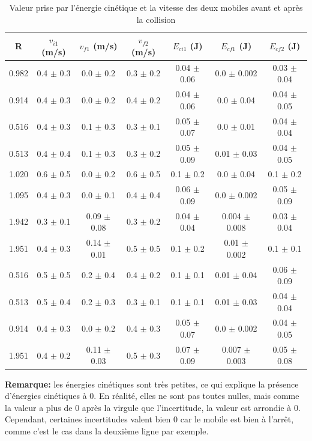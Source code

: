 \documentclass[12pt]{article}
\begin{document}
\begin{table}[h!]
    \begin{center}
        \begin{tabular}{|c|c|c|c|c|c|c|}
            \hline
            R & $v_{i1}$ (m/s) & $v_{f1}$ (m/s) & $v_{f2}$ (m/s) & $E_{ci1}$ (J) & $E_{cf1}$ (J) & $E_{cf2}$ (J) \\ \hline
            0.982 & 0.4 $\pm$ 0.3 & 0.0 $\pm$ 0.2 & 0.3 $\pm$ 0.2 & 0.04 $\pm$ 0.06 & 0.0 $\pm$ 0.002 & 0.03 $\pm$ 0.04 \\ 
0.914 & 0.4 $\pm$ 0.3 & 0.0 $\pm$ 0.2 & 0.4 $\pm$ 0.2 & 0.04 $\pm$ 0.06 & 0.0 $\pm$ 0.04 & 0.04 $\pm$ 0.05 \\ 
0.516 & 0.4 $\pm$ 0.3 & 0.1 $\pm$ 0.3 & 0.3 $\pm$ 0.1 & 0.05 $\pm$ 0.07 & 0.0 $\pm$ 0.01 & 0.04 $\pm$ 0.04 \\ 
0.513 & 0.4 $\pm$ 0.4 & 0.1 $\pm$ 0.3 & 0.3 $\pm$ 0.2 & 0.05 $\pm$ 0.09 & 0.01 $\pm$ 0.03 & 0.04 $\pm$ 0.05 \\ 
1.020 & 0.6 $\pm$ 0.5 & 0.0 $\pm$ 0.2 & 0.6 $\pm$ 0.5 & 0.1 $\pm$ 0.2 & 0.0 $\pm$ 0.04 & 0.1 $\pm$ 0.2 \\ 
1.095 & 0.4 $\pm$ 0.3 & 0.0 $\pm$ 0.1 & 0.4 $\pm$ 0.4 & 0.06 $\pm$ 0.09 & 0.0 $\pm$ 0.002 & 0.05 $\pm$ 0.09 \\ 
1.942 & 0.3 $\pm$ 0.1 & 0.09 $\pm$ 0.08 & 0.3 $\pm$ 0.2 & 0.04 $\pm$ 0.04 & 0.004 $\pm$ 0.008 & 0.03 $\pm$ 0.04 \\ 
1.951 & 0.4 $\pm$ 0.3 & 0.14 $\pm$ 0.01 & 0.5 $\pm$ 0.5 & 0.1 $\pm$ 0.2 & 0.01 $\pm$ 0.002 & 0.1 $\pm$ 0.1 \\ 
0.516 & 0.5 $\pm$ 0.5 & 0.2 $\pm$ 0.4 & 0.4 $\pm$ 0.2 & 0.1 $\pm$ 0.1 & 0.01 $\pm$ 0.04 & 0.06 $\pm$ 0.09 \\ 
0.513 & 0.5 $\pm$ 0.4 & 0.2 $\pm$ 0.3 & 0.3 $\pm$ 0.1 & 0.1 $\pm$ 0.1 & 0.01 $\pm$ 0.03 & 0.04 $\pm$ 0.04 \\ 
0.914 & 0.4 $\pm$ 0.3 & 0.0 $\pm$ 0.2 & 0.4 $\pm$ 0.3 & 0.05 $\pm$ 0.07 & 0.0 $\pm$ 0.002 & 0.04 $\pm$ 0.05 \\ 
1.951 & 0.4 $\pm$ 0.2 & 0.11 $\pm$ 0.03 & 0.5 $\pm$ 0.3 & 0.07 $\pm$ 0.09 & 0.007 $\pm$ 0.003 & 0.05 $\pm$ 0.08 \\ 

            \hline
        \end{tabular}
    \end{center}
	\caption{Valeur prise par l'énergie cinétique et la vitesse des deux mobiles avant et après la collision}
\end{table}

\textbf{Remarque:} les énergies cinétiques sont très petites, ce qui explique la présence d'énergies cinétiques à $0$. En réalité, elles ne sont pas toutes nulles,
mais comme la valeur a plus de $0$ après la virgule que l'incertitude, la valeur est arrondie à 0. Cependant, certaines incertitudes valent bien 0 car le mobile 
est bien à l'arrêt, comme c'est le cas dans la deuxième ligne par exemple.
\end{document}
